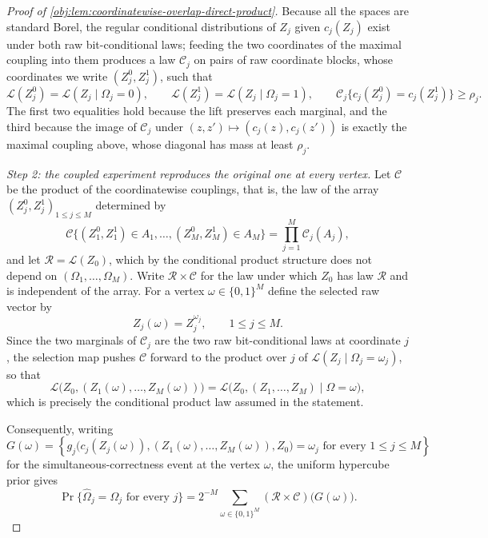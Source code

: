 \documentclass[11pt]{article}
\begin{document}
\begin{proof}[Proof of \cref{obj:lem:coordinatewise-overlap-direct-product}]
Because all the spaces are standard Borel, the regular conditional distributions of \(Z_j\) given \(c_j(Z_j)\) exist under both raw bit-conditional laws; feeding the two coordinates of the maximal coupling into them produces a law \(\mathcal C_j\) on pairs of raw coordinate blocks, whose coordinates we write \((Z_j^0,Z_j^1)\), such that
\[
\mathcal L(Z_j^0)=\mathcal L(Z_j\mid\Omega_j=0),
\qquad
\mathcal L(Z_j^1)=\mathcal L(Z_j\mid\Omega_j=1),
\qquad
\mathcal C_j\bigl\{c_j(Z_j^0)=c_j(Z_j^1)\bigr\}\geq\rho_j .
\]
The first two equalities hold because the lift preserves each marginal, and the third because the image of \(\mathcal C_j\) under \((z,z')\mapsto(c_j(z),c_j(z'))\) is exactly the maximal coupling above, whose diagonal has mass at least \(\rho_j\).

\emph{Step 2: the coupled experiment reproduces the original one at every vertex.}
Let \(\mathcal C\) be the product of the coordinatewise couplings, that is, the law of the array \((Z_j^0,Z_j^1)_{1\leq j\leq M}\) determined by
\[
\mathcal C\bigl\{(Z_1^0,Z_1^1)\in A_1,\ldots,(Z_M^0,Z_M^1)\in A_M\bigr\}
=\prod_{j=1}^M\mathcal C_j(A_j),
\]
and let \(\mathcal R=\mathcal L(Z_0)\), which by the conditional product structure does not depend on \((\Omega_1,\ldots,\Omega_M)\). Write \(\mathcal R\times\mathcal C\) for the law under which \(Z_0\) has law \(\mathcal R\) and is independent of the array. For a vertex \(\omega\in\{0,1\}^M\) define the selected raw vector by
\[
Z_j(\omega)=Z_j^{\omega_j},
\qquad 1\leq j\leq M .
\]
Since the two marginals of \(\mathcal C_j\) are the two raw bit-conditional laws at coordinate \(j\), the selection map pushes \(\mathcal C\) forward to the product over \(j\) of \(\mathcal L(Z_j\mid\Omega_j=\omega_j)\), so that
\[
\mathcal L\bigl(Z_0,(Z_1(\omega),\ldots,Z_M(\omega))\bigr)
=
\mathcal L\bigl(Z_0,(Z_1,\ldots,Z_M)\mid\Omega=\omega\bigr),
\]
which is precisely the conditional product law assumed in the statement.

Consequently, writing
\[
G(\omega)
=
\left\{
g_j\bigl(c_j(Z_j(\omega)),(Z_1(\omega),\ldots,Z_M(\omega)),Z_0\bigr)=\omega_j
\text{ for every }1\leq j\leq M
\right\}
\]
for the simultaneous-correctness event at the vertex \(\omega\), the uniform hypercube prior gives
\[
\Pr\{\widehat\Omega_j=\Omega_j\text{ for every }j\}
=
2^{-M}\sum_{\omega\in\{0,1\}^M}(\mathcal R\times\mathcal C)\bigl(G(\omega)\bigr).
\]


\end{proof}
\end{document}
